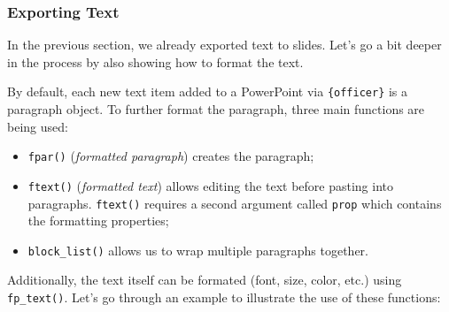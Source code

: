 \documentclass[
]{krantz}
\providecommand{\tightlist}{%
  \setlength{\itemsep}{0pt}\setlength{\parskip}{0pt}}
\begin{document}
\hypertarget{exporting-text}{%
\subsubsection{Exporting Text}\label{exporting-text}}

In the previous section, we already exported text to slides. Let's go a bit deeper in the process by also showing how to format the text.

By default, each new text item added to a PowerPoint via \texttt{\{officer\}} is a paragraph object. To further format the paragraph, three main functions are being used:

\begin{itemize}
\tightlist
\item
  \texttt{fpar()} (\emph{formatted paragraph}) creates the paragraph;
\item
  \texttt{ftext()} (\emph{formatted text}) allows editing the text before pasting into paragraphs. \texttt{ftext()} requires a second argument called \texttt{prop} which contains the formatting properties;
\item
  \texttt{block\_list()} allows us to wrap multiple paragraphs together.
\end{itemize}

Additionally, the text itself can be formated (font, size, color, etc.) using \texttt{fp\_text()}. Let's go through an example to illustrate the use of these functions:
\end{document}
